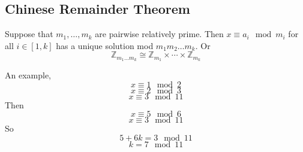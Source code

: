 \documentclass{article}
\begin{document}
\subsection{Chinese Remainder Theorem}
Suppose that 
$m_1, \ldots, m_k$ are pairwise relatively prime. Then 
$x \equiv a_i \mod m_i$
for all $i \in [1,k]$ has a unique solution mod $m_1 m_2 \ldots m_k$. Or 
\[ \mathbb{Z}_{m_1\ldots m_k} \cong \mathbb{Z}_{m_1} \times \cdots \times
\mathbb{Z}_{m_k} \]

An example,
\[ x \equiv 1 \mod 2 \]
\[ x \equiv 2 \mod 3 \]
\[ x \equiv 3 \mod 11 \]
Then
\[ x \equiv 5 \mod 6 \]
\[ x \equiv 3 \mod 11 \]
So
\[ 5 + 6k = 3 \mod 11 \]
\[ k = 7 \mod 11 \]
\end{document}
